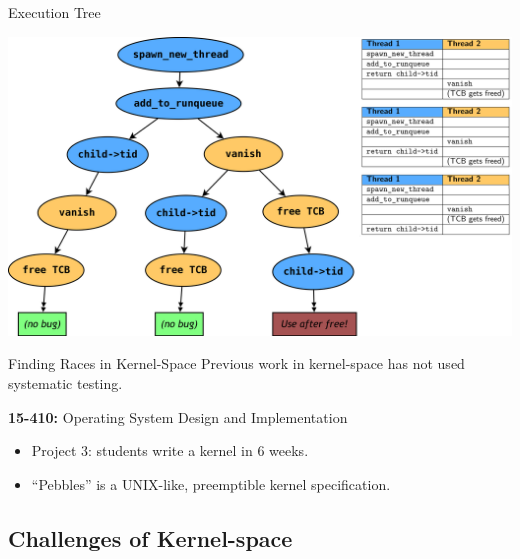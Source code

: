 \documentclass[xcolor=dvipsnames]{beamer}
\begin{document}
\begin{frame}{Execution Tree} %
	\begin{center}
		\includegraphics[width=\textwidth]{tree.png}
	\end{center}
\end{frame}

\begin{frame}{Finding Races in Kernel-Space} %
	Previous work in kernel-space has not used systematic testing.
	\linegap

	\textbf{15-410:} Operating System Design and Implementation
	\begin{itemize}
		\item Project 3: students write a kernel in 6 weeks.
		\item ``Pebbles'' is a UNIX-like, preemptible kernel specification.
	\end{itemize}
\end{frame}

\subsection{Challenges of Kernel-space}

\end{document}
